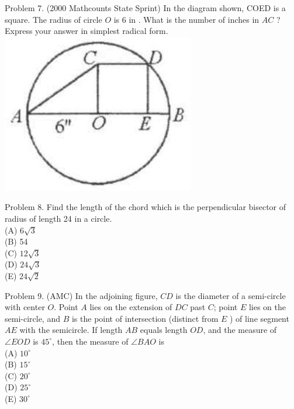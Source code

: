 \documentclass[10pt]{article}
\begin{document}
Problem 7. (2000 Mathcounts State Sprint) In the diagram shown, COED is a square. The radius of circle \(O\) is 6 in . What is the number of inches in \(A C\) ? Express your answer in simplest radical form.\\
\includegraphics[max width=\textwidth, center]{2025_04_17_97bc1f7e44d93c271a88g-155}

Problem 8. Find the length of the chord which is the perpendicular bisector of radius of length 24 in a circle.\\
(A) \(6 \sqrt{3}\)\\
(B) 54\\
(C) \(12 \sqrt{3}\)\\
(D) \(24 \sqrt{3}\)\\
(E) \(24 \sqrt{2}\)

Problem 9. (AMC) In the adjoining figure, \(C D\) is the diameter of a semi-circle with center \(O\). Point \(A\) lies on the extension of \(D C\) past \(C\); point \(E\) lies on the semi-circle, and \(B\) is the point of intersection (distinct from \(E\) ) of line segment \(A E\) with the semicircle. If length \(A B\) equals length \(O D\), and the measure of \(\angle E O D\) is \(45^{\circ}\), then the measure of \(\angle B A O\) is\\
(A) \(10^{\circ}\)\\
(B) \(15^{\circ}\)\\
(C) \(20^{\circ}\)\\
(D) \(25^{\circ}\)\\
(E) \(30^{\circ}\)
\end{document}
